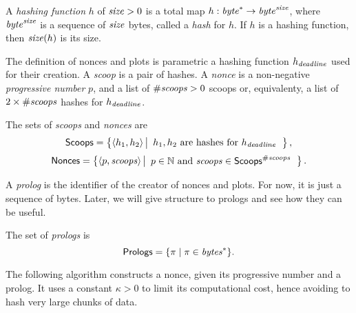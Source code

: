 %
\begin{definition}
  A \emph{hashing function} $h$ of ${\mathit{size}}>0$
  is a total map $h:\mathit{byte}^*\to\mathit{byte}^{\mathit{size}}$, where
  $\mathit{byte}^{\mathit{size}}$ is a sequence of ${\mathit{size}}$ bytes, called a \emph{hash} for $h$.
  If $h$ is a hashing function, then ${\mathit{size}}(h)$ is its size.
\end{definition}
%
The definition of nonces and plots is parametric \wrt a hashing
function $h_{\mathit{deadline}}$ used for their creation.
A \emph{scoop} is a pair of hashes.
A \emph{nonce} is a non-negative \emph{progressive number} $p$, and
a list of ${\#\mathit{scoops}}>0$ scoops or, equivalenty,
a list of $2\times{\#\mathit{scoops}}$ hashes for $h_{\mathit{deadline}}$.
%
\begin{definition}
  The sets of \emph{scoops} and \emph{nonces} are
  \[
  {\mathsf{Scoops}}=\left\{\langle h_1,h_2\rangle\left|\begin{array}{l}
  h_1,h_2\text{ are hashes for }h_{\mathit{deadline}}
  \end{array}\right.\right\},
  \]
  \[
  {\mathsf{Nonces}}=\left\{\langle p,{\mathit{scoops}}\rangle\left|\begin{array}{l}
  p\in\mathbb{N}\text{ and }{\mathit{scoops}}\in{\mathsf{Scoops}}^{\#\mathit{scoops}}
  \end{array}\right.\right\}.
  \]
\end{definition}
%
A \emph{prolog} is the identifier of the creator of nonces and plots.
For now, it is just a sequence of bytes. Later, we will give structure to prologs
and see how they can be useful.
%
\begin{definition}[Prolog]\label{def:prolog}
  The set of \emph{prologs} is
  \[
  {\mathsf{Prologs}}=\{\pi\mid\pi\in\mathit{bytes}^*\}.
  \]
\end{definition}
%
The following algorithm constructs a nonce, given its progressive number and a prolog.
It uses a constant $\kappa>0$ to limit its computational cost, hence avoiding to hash
very large chunks of data.
%
